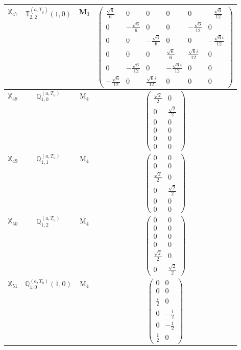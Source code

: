 \documentclass[fleqn,10pt,landscape]{article}
\begin{document}
\begin{itemize}
\begin{center}
\begin{longtable}{c|c|c|c}
$ \mathbb{X}_{47} $ & $\mathbb{T}_{2,2}^{(a,T_{g})}(1,0)$ & M$_{3}$ & $\begin{pmatrix} \frac{\sqrt{6}}{6} & 0 & 0 & 0 & 0 & - \frac{\sqrt{6}}{12} \\ 0 & - \frac{\sqrt{6}}{6} & 0 & 0 & - \frac{\sqrt{6}}{12} & 0 \\ 0 & 0 & - \frac{\sqrt{6}}{6} & 0 & 0 & - \frac{\sqrt{6} i}{12} \\ 0 & 0 & 0 & \frac{\sqrt{6}}{6} & \frac{\sqrt{6} i}{12} & 0 \\ 0 & - \frac{\sqrt{6}}{12} & 0 & - \frac{\sqrt{6} i}{12} & 0 & 0 \\ - \frac{\sqrt{6}}{12} & 0 & \frac{\sqrt{6} i}{12} & 0 & 0 & 0 \end{pmatrix}$ \\ \hline
$ \mathbb{X}_{48} $ & $\mathbb{Q}_{1,0}^{(a,T_{u})}$ & M$_{4}$ & $\begin{pmatrix} \frac{\sqrt{2}}{2} & 0 \\ 0 & \frac{\sqrt{2}}{2} \\ 0 & 0 \\ 0 & 0 \\ 0 & 0 \\ 0 & 0 \end{pmatrix}$ \\
$ \mathbb{X}_{49} $ & $\mathbb{Q}_{1,1}^{(a,T_{u})}$ & M$_{4}$ & $\begin{pmatrix} 0 & 0 \\ 0 & 0 \\ \frac{\sqrt{2}}{2} & 0 \\ 0 & \frac{\sqrt{2}}{2} \\ 0 & 0 \\ 0 & 0 \end{pmatrix}$ \\
$ \mathbb{X}_{50} $ & $\mathbb{Q}_{1,2}^{(a,T_{u})}$ & M$_{4}$ & $\begin{pmatrix} 0 & 0 \\ 0 & 0 \\ 0 & 0 \\ 0 & 0 \\ \frac{\sqrt{2}}{2} & 0 \\ 0 & \frac{\sqrt{2}}{2} \end{pmatrix}$ \\
$ \mathbb{X}_{51} $ & $\mathbb{Q}_{1,0}^{(a,T_{u})}(1,0)$ & M$_{4}$ & $\begin{pmatrix} 0 & 0 \\ 0 & 0 \\ \frac{i}{2} & 0 \\ 0 & - \frac{i}{2} \\ 0 & - \frac{1}{2} \\ \frac{1}{2} & 0 \end{pmatrix}$ \\

\end{longtable}
\end{center}
\end{itemize}
\end{document}
